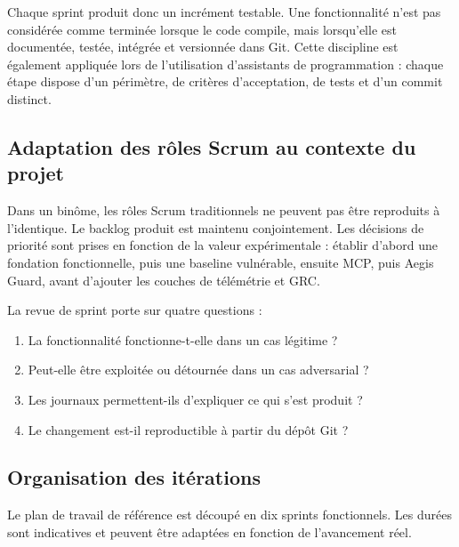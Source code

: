 Chaque sprint produit donc un incrément testable. Une fonctionnalité n'est pas considérée comme terminée lorsque le code compile, mais lorsqu'elle est documentée, testée, intégrée et versionnée dans Git. Cette discipline est également appliquée lors de l'utilisation d'assistants de programmation : chaque étape dispose d'un périmètre, de critères d'acceptation, de tests et d'un commit distinct.

\subsection{Adaptation des rôles Scrum au contexte du projet}

Dans un binôme, les rôles Scrum traditionnels ne peuvent pas être reproduits à l'identique. Le backlog produit est maintenu conjointement. Les décisions de priorité sont prises en fonction de la valeur expérimentale : établir d'abord une fondation fonctionnelle, puis une baseline vulnérable, ensuite MCP, puis Aegis Guard, avant d'ajouter les couches de télémétrie et GRC.

La revue de sprint porte sur quatre questions :

\begin{enumerate}
    \item La fonctionnalité fonctionne-t-elle dans un cas légitime ?
    \item Peut-elle être exploitée ou détournée dans un cas adversarial ?
    \item Les journaux permettent-ils d'expliquer ce qui s'est produit ?
    \item Le changement est-il reproductible à partir du dépôt Git ?
\end{enumerate}

\subsection{Organisation des itérations}

Le plan de travail de référence est découpé en dix sprints fonctionnels. Les durées sont indicatives et peuvent être adaptées en fonction de l'avancement réel.

